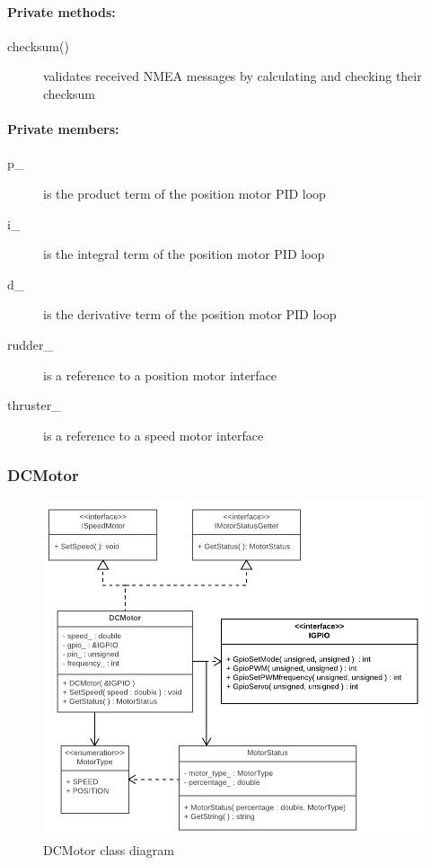 \paragraph{Private methods:}
\begin{adjustwidth}{2.5em}{0pt}\begin{description}
		\item [checksum()] validates received NMEA messages by calculating and checking their checksum
\end{description}\end{adjustwidth}

\paragraph{Private members:}
\begin{adjustwidth}{2.5em}{0pt}\begin{description}
		\item [p_] is the product term of the position motor PID loop
		\item [i_] is the integral term of the position motor PID loop
		\item [d_] is the derivative term of the position motor PID loop
		\item [rudder_] is a reference to a position motor interface
		\item [thruster_] is a reference to a speed motor interface
\end{description}\end{adjustwidth}

\subsubsection{DCMotor}

\begin{figure}[H]
\centering
\includegraphics[width=1\linewidth]{Images/Design/DCMotor_class_diagram}
\caption{DCMotor class diagram}
\label{fig:dcmotor}
\end{figure}


